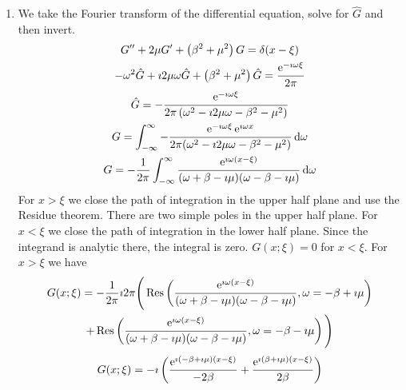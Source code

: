 {%
\begin{Solution}
  \label{solution ode ft green y+2my+b2m2y=d}
  \begin{enumerate}
  \item
    We take the Fourier transform of the differential equation, solve for 
    $\hat{G}$ and then invert.
    \begin{gather*}
      G'' + 2 \mu G' + \left( \beta^2 + \mu^2 \right) G = \delta(x - \xi) 
      \\
      - \omega^2 \hat{G} + \imath 2 \mu \omega \hat{G} + \left( \beta^2 + \mu^2 \right) \hat{G}
      = \frac{ \mathop{\mathrm{e}}\nolimits^{-\imath \omega \xi} }{ 2 \pi } 
      \\
      \hat{G} = - \frac{ \mathop{\mathrm{e}}\nolimits^{-\imath \omega \xi} }{ 2 \pi \left( \omega^2 - \imath 2 \mu \omega - \beta^2 - \mu^2 \right) }
      \\
      G = \int_{-\infty}^\infty - \frac{ \mathop{\mathrm{e}}\nolimits^{-\imath \omega \xi} \mathop{\mathrm{e}}\nolimits^{\imath \omega x} }
      { 2 \pi ( \omega^2 - \imath 2 \mu \omega - \beta^2 - \mu^2 ) }\,\mathrm{d} \omega 
      \\
      G = - \frac{1}{2 \pi} \int_{-\infty}^\infty \frac{ \mathop{\mathrm{e}}\nolimits^{\imath \omega (x-\xi)} }
      { (\omega + \beta - \imath \mu)(\omega - \beta - \imath \mu) }\,\mathrm{d} \omega
    \end{gather*}
    For $x > \xi$ we close the path of integration in the upper half
    plane and use the Residue theorem.  There are two simple poles in
    the upper half plane.  For $x < \xi$ we close the path of
    integration in the lower half plane.  Since the integrand is
    analytic there, the integral is zero. $G(x;\xi) = 0$ for $x < \xi$.
    For $x > \xi$ we have
    \begin{multline*}
      G(x;\xi) = - \frac{1}{2 \pi} \imath 2 \pi \Bigg( 
      \mathop{\mathrm{Res}}\nolimits \left( \frac{ \mathop{\mathrm{e}}\nolimits^{\imath \omega (x-\xi)} }{ (\omega + \beta - \imath \mu)(\omega - \beta - \imath \mu) },
        \omega = - \beta + \imath \mu \right) 
      \\
      + \mathop{\mathrm{Res}}\nolimits \left( \frac{ \mathop{\mathrm{e}}\nolimits^{\imath \omega (x-\xi)} }{ (\omega + \beta - \imath \mu)(\omega - \beta - \imath \mu) },
        \omega = - \beta - \imath \mu \right) \Bigg)
    \end{multline*}
    \begin{gather*}
      G(x;\xi) = - \imath \left( 
        \frac{ \e^{\imath (- \beta + \imath \mu)(x-\xi)} }{ - 2 \beta }
        + \frac{ \e^{\imath (\beta + \imath \mu)(x-\xi)} }{ 2 \beta }
      \right) 
      \\

\end{gather*}
\end{enumerate}
\end{Solution}}
